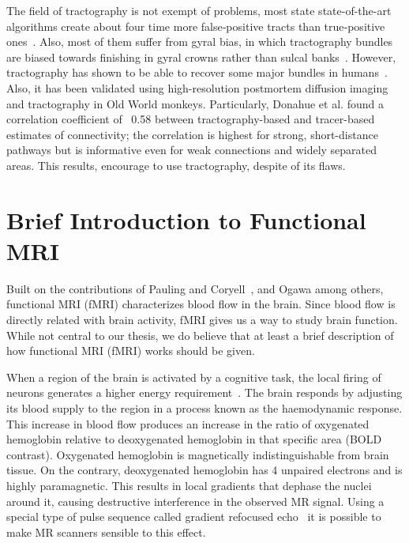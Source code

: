 The field of tractography is not exempt of problems, most state state-of-the-art
algorithms create about four time more false‐positive tracts than true‐positive
ones~\cite{Maier-hein2017}. Also, most of them suffer from gyral bias, in which tractography bundles
are biased towards finishing in gyral crowns rather than sulcal banks~\cite{VanEssen2014}.
However, tractography has shown to be able to recover some major
bundles in humans~\cite{Catani2008}. Also, it has been validated using high-resolution
postmortem diffusion imaging and tractography in Old World monkeys. Particularly,
Donahue et al.\cite{Donahue2016} found a correlation
coefficient of ~0.58 between tractography-based and tracer-based estimates of
connectivity; the correlation is highest for strong, short-distance pathways
but is informative even for weak connections and widely separated areas. This
results, encourage to use tractography, despite of its flaws.

\section{Brief Introduction to Functional MRI}

Built on the contributions of Pauling and Coryell~\cite{Pauling1936}, and 
Ogawa\cite{Ogawa1990, Ogawa1993} among others, functional MRI (fMRI) characterizes
blood flow in the brain. Since blood flow is directly related with brain
activity, fMRI gives us a way to study brain function. While not central to our
thesis, we do believe that at least a brief description of how functional MRI
(fMRI) works should be given.

When a region of the brain is activated by a cognitive task, the local firing
of neurons generates a higher energy requirement~\cite{Glover2011}.
The brain responds by adjusting its blood supply to the region in a process
known as the haemodynamic response. This increase in blood flow produces an
increase in the ratio of oxygenated hemoglobin relative to deoxygenated hemoglobin
in that specific area (BOLD contrast). Oxygenated hemoglobin is magnetically 
indistinguishable from brain tissue. On the contrary, deoxygenated hemoglobin
has 4 unpaired electrons and is highly paramagnetic\cite{Glover2011}. This
results in local gradients that dephase the nuclei around it, causing destructive
interference in the observed MR signal. Using a special type of pulse sequence
called gradient refocused echo~\cite{Elster1993} it is possible to make MR
scanners sensible to this effect.


